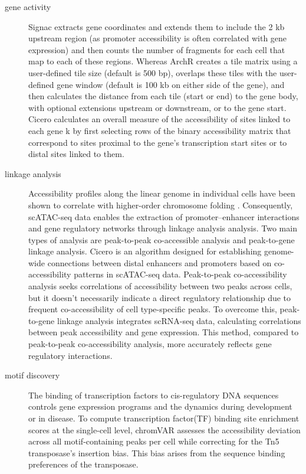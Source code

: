 \begin{description}
	\item[gene activity]
	Signac\citep{signac} extracts gene coordinates and extends them to include the 2 kb upstream region (as promoter accessibility is often correlated with gene expression) and then counts the number of fragments for each cell that map to each of these regions. Whereas ArchR\citep{granja2019single} creates a tile matrix using a user-defined tile size (default is 500 bp), overlaps these tiles with the user-defined gene window (default is 100 kb on either side of the gene), and then calculates the distance from each tile (start or end) to the gene body, with optional extensions upstream or downstream, or to the gene start. Cicero\citep{pliner2018cicero} calculates an overall measure of the accessibility of sites linked to each gene k by first selecting rows of the binary accessibility matrix that correspond to sites proximal to the gene’s transcription start sites or to distal sites linked to them.
	\item[linkage analysis]
	Accessibility profiles along the linear genome in individual cells have been shown to correlate with higher-order chromosome folding \citep{Buenrostro2015}. Consequently, scATAC-seq data enables the extraction of promoter–enhancer interactions and gene regulatory networks through linkage analysis analysis. Two main types of analysis are peak-to-peak co-accessible analysis and peak-to-gene linkage analysis. Cicero \citep{pliner2018cicero} is an algorithm designed for establishing genome-wide connections between distal enhancers and promoters based on co-accessibility patterns in scATAC-seq data. Peak-to-peak co-accessibility analysis seeks correlations of accessibility between two peaks across cells, but it doesn't necessarily indicate a direct regulatory relationship due to frequent co-accessibility of cell type-specific peaks. To overcome this, peak-to-gene linkage analysis integrates scRNA-seq data, calculating correlations between peak accessibility and gene expression\citep{Granja2021}. This method, compared to peak-to-peak co-accessibility analysis, more accurately reflects gene regulatory interactions\citep{shi2022scatacoverview}.
	\item[motif discovery]
	The binding of transcription factors to cis-regulatory DNA sequences controls gene expression programs and the dynamics during development or in disease. To compute transcription factor(TF) binding site enrichment scores at the single-cell level, chromVAR\citep{schep2017chromvar} assesses the accessibility deviation across all motif-containing peaks per cell while correcting for the Tn5 transposase's insertion bias. This bias arises from the sequence binding preferences of the transposase. 

\end{description}

